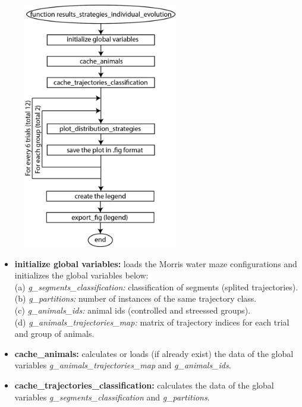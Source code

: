\documentclass[12pt,titlepage]{article}
\begin{document}
\begin{doublespace}
\begin{figure}[H]
	\begin{center}
		\includegraphics[width=0.6\textwidth]{results_strategies_individual_evolution.jpg}
		\label{fig4}
	\end{center}
\end{figure}

\begin{itemize}
	\item\textbf{initialize global variables:} loads the Morris water maze configurations and initializes the global variables below:\\
	(a) \textit{g\_segments\_classification:} classification of segments (splited trajectories).\\
	(b) \textit{g\_partitions:} number of instances of the same trajectory class.\\
	(c) \textit{g\_animals\_ids:} animal ids (controlled and streessed groups).\\
	(d) \textit{g\_animals\_trajectories\_map:} matrix of trajectory indices for each trial and group of animals.
	\item\textbf{cache\_animals:} calculates or loads (if already exist) the data of the global variables \textit{g\_animals\_trajectories\_map} and \textit{g\_animals\_ids}.
	\item\textbf{cache\_trajectories\_classification:}  calculates the data of the global variables \textit{g\_segments\_classification} and \textit{g\_partitions}.
\end{itemize}


\end{doublespace}
\end{document}
